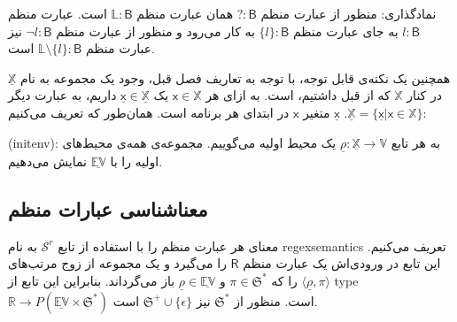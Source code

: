 نمادگذاری: منظور از عبارت منظم 
$\mathsf{? : B}$
همان عبارت منظم
$\mathbb{L}\mathsf{ : B}$
است. عبارت منظم 
$l : \mathsf{B}$
به جای عبارت منظم 
$\{l\} : \mathsf{B}$
به کار می‌رود و منظور از عبارت منظم
$\neg l \mathsf{: B}$
نیز عبارت منظم 
$\mathbb{L}\setminus\{l\}:\mathsf{B}$
است. 

همچنین یک نکته‌ی قابل توجه، با توجه به تعاریف فصل قبل، وجود یک مجموعه به نام
$\mathbb{\underline{X}}$
در کنار 
$\mathbb{X}$
که از قبل داشتیم، است. به ازای هر 
$\mathsf{x}\in\mathbb{X}$
یک 
$\mathsf{\underline{x}}\in\mathbb{\underline{X}}$
داریم، به عبارت دیگر 
$\mathbb{\underline{X}}=\{\underline{\mathsf{x}}|\mathsf{x}\in \mathbb{X}\}$.
$\mathsf{\underline{x}}$
متغیر 
$\mathsf{x}$
در ابتدای هر برنامه است.  همان‌طور که تعریف می‌کنیم:
\begin{defn}
	(\gls{initenv}): به هر تابع  
	$\underline{\rho}:\underline{\mathbb{X}}\rightarrow\mathbb{V}$
	یک محیط اولیه می‌گوییم. مجموعه‌ی همه‌ی محیط‌های اولیه را با 
	$\underline{\mathbb{EV}}$
	نمایش می‌دهیم.
\end{defn}
 
\subsection{معناشناسی عبارات منظم}
معنای هر عبارت منظم را با استفاده از تابع 
$\mathcal{S}^r$
به نام \gls{regexsemantics} تعریف می‌کنیم. این تابع در ورودی‌اش یک عبارت منظم 
$\mathsf{R}$
را می‌گیرد و یک مجموعه از زوج مرتب‌های
$\langle\underline{\rho} , \pi\rangle$
را که 
$\pi \in \mathfrak{S^*}$
و 
$\underline{\rho} \in \underline{\mathbb{EV}}$
باز می‌گرداند. بنابراین این تابع از \gls*{type}
$\mathbb{R} \rightarrow \mathit{P} (\mathbb{\underline{EV}} \times \mathfrak{S}^*)$
است.
 منظور از 
 $\mathfrak{S}^*$
 نیز 
 $\mathfrak{S}^+ \cup \{\epsilon\}$
 است.
 
